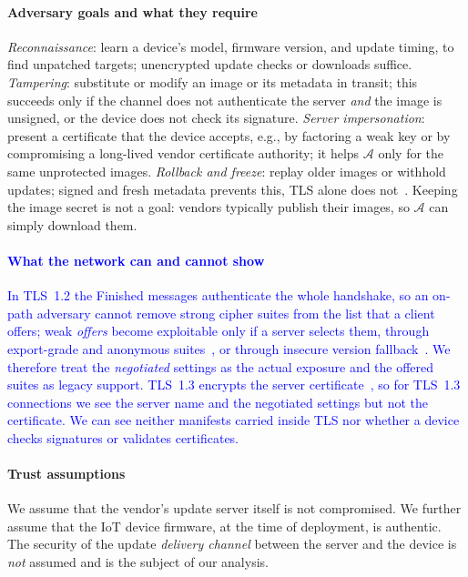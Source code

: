 \paragraph{Adversary goals and what they require}
\emph{Reconnaissance}: learn a device's model, firmware version, and update timing, to find unpatched targets; unencrypted update checks or downloads suffice.
\emph{Tampering}: substitute or modify an image or its metadata in transit; this succeeds only if the channel does not authenticate the server \emph{and} the image is unsigned, or the device does not check its signature.
\emph{Server impersonation}: present a certificate that the device accepts, e.g., by factoring a weak key or by compromising a long-lived vendor certificate authority; it helps $\mathcal{A}$ only for the same unprotected images.
\emph{Rollback and freeze}: replay older images or withhold updates; signed and fresh metadata prevents this, TLS alone does not~\cite{samuel2010tuf}.
Keeping the image secret is not a goal: vendors typically publish their images, so $\mathcal{A}$ can simply download them.

\paragraph{\textcolor{blue}{What the network can and cannot show}}
\textcolor{blue}{In TLS~1.2 the Finished messages authenticate the whole handshake, so an on-path adversary cannot remove strong cipher suites from the list that a client offers; weak \emph{offers} become exploitable only if a server selects them, through export-grade and anonymous suites~\cite{beurdouche2015freak,adrian2015logjam}, or through insecure version fallback~\cite{rfc7507}.
We therefore treat the \emph{negotiated} settings as the actual exposure and the offered suites as legacy support.
TLS~1.3 encrypts the server certificate~\cite{rfc8446}, so for TLS~1.3 connections we see the server name and the negotiated settings but not the certificate.
We can see neither manifests carried inside TLS nor whether a device checks signatures or validates certificates.}

\paragraph{Trust assumptions}
We assume that the vendor's update server itself is not compromised.
We further assume that the IoT device firmware, at the time of deployment, is authentic. The security of the update \emph{delivery channel} between the server and the device is \emph{not} assumed and is the subject of our analysis.
